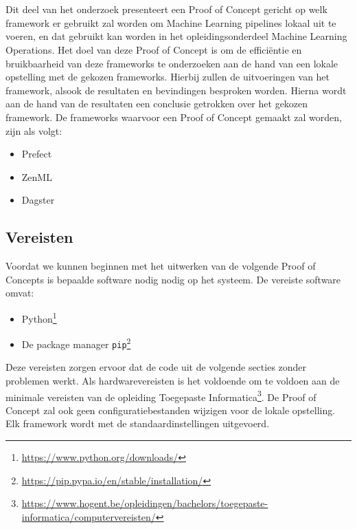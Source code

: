 \chapter{}%
\label{ch:PoC}

Dit deel van het onderzoek presenteert een Proof of Concept gericht op welk framework er gebruikt zal worden om Machine Learning pipelines lokaal uit te voeren, en dat gebruikt kan worden in het opleidingsonderdeel Machine Learning Operations.
Het doel van deze Proof of Concept is om de efficiëntie en bruikbaarheid van deze frameworks te onderzoeken aan de hand van een lokale opstelling met de gekozen frameworks. Hierbij zullen de uitvoeringen van het framework, alsook de resultaten en bevindingen besproken worden.
Hierna wordt aan de hand van de resultaten een conclusie getrokken over het gekozen framework.
De frameworks waarvoor een Proof of Concept gemaakt zal worden, zijn als volgt:
\begin{itemize}
    \item Prefect
    \item ZenML
    \item Dagster
\end{itemize}

\section{Vereisten}

Voordat we kunnen beginnen met het uitwerken van de volgende Proof of Concepts is bepaalde software nodig nodig op het systeem. De vereiste software omvat:

\begin{itemize}
    \item Python\footnote{\url{https://www.python.org/downloads/}}
    \item De package manager \texttt{pip}\footnote{\url{https://pip.pypa.io/en/stable/installation/}}
\end{itemize}

Deze vereisten zorgen ervoor dat de code uit de volgende secties zonder problemen werkt. Als hardwarevereisten is het voldoende om te voldoen aan de minimale vereisten van de opleiding Toegepaste Informatica\footnote{\url{https://www.hogent.be/opleidingen/bachelors/toegepaste-informatica/computervereisten/}}. De Proof of Concept zal ook geen configuratiebestanden wijzigen voor de lokale opstelling. Elk framework wordt met de standaardinstellingen uitgevoerd.


